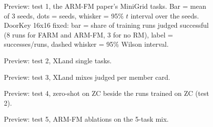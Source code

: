 \documentclass[11pt,a4paper]{article}
\begin{document}
\begin{figure}[H]
\centering

\caption{Preview: test 1, the ARM-FM paper's MiniGrid tasks. Bar = mean of 3 seeds, dots = seeds,
whisker = 95\% $t$ interval over the seeds. DoorKey 16x16 fixed: bar = share of training runs judged
successful (8 runs for FARM and ARM-FM, 3 for no RM), label = successes/runs, dashed whisker = 95\%
Wilson interval.}
\end{figure}

\begin{figure}[H]
\centering

\caption{Preview: test 2, XLand single tasks.}
\end{figure}
\clearpage

\begin{figure}[H]
\centering

\caption{Preview: test 3, XLand mixes judged per member card.}
\end{figure}

\begin{figure}[H]
\centering

\caption{Preview: test 4, zero-shot on ZC beside the runs trained on ZC (test 2).}
\end{figure}
\clearpage

\begin{figure}[H]
\centering

\caption{Preview: test 5, ARM-FM ablations on the 5-task mix.}
\end{figure}
\end{document}
